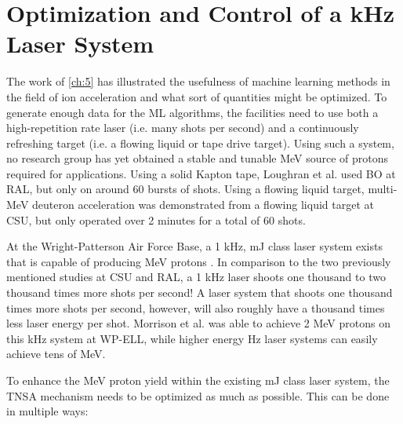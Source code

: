 \chapter{Optimization and Control of a kHz Laser System} \label{ch:6}

The work of \autoref{ch:5} has illustrated the usefulness of machine learning methods in the field of ion acceleration and what sort of quantities might be optimized. To generate enough data for the \gls{ML} algorithms, the facilities need to use both a high-repetition rate laser (i.e. many shots per second) and a continuously refreshing target (i.e. a flowing liquid or tape drive target). Using such a system, no research group has yet obtained a stable and tunable MeV source of protons required for applications. Using a solid Kapton tape, Loughran et al. \cite{Loughran_2023_HPLSE} used \gls{BO} at \gls{RAL}, but only on around 60 bursts of shots. Using a flowing liquid target, multi-MeV deuteron acceleration \cite{Treffert_2022_APL} was demonstrated from a flowing liquid target at \gls{CSU}, but only operated over 2 minutes for a total of 60 shots.

At the Wright-Patterson Air Force Base, a 1 kHz, mJ class laser system exists that is capable of producing MeV protons \cite{Morrison_2018_NJoP}. In comparison to the two previously mentioned studies at \gls{CSU} and \gls{RAL}, a 1 kHz laser shoots one thousand to two thousand times more shots per second! A laser system that shoots one thousand times more shots per second, however, will also roughly have a thousand times less laser energy per shot. Morrison et al. \cite{Morrison_2018_NJoP} was able to achieve 2 MeV protons on this kHz system at \gls{WP-ELL}, while higher energy Hz laser systems can easily achieve tens of MeV. 

To enhance the MeV proton yield within the existing mJ class laser system, the \gls{TNSA} mechanism needs to be optimized as much as possible. This can be done in multiple ways:

